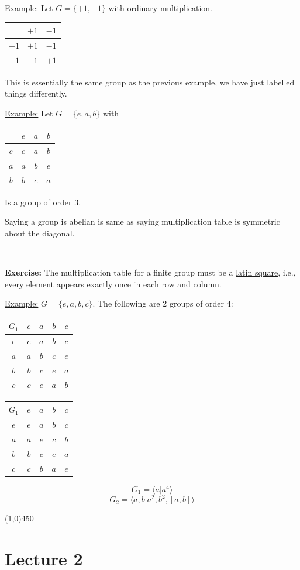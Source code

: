 \documentclass{article}
\theoremstyle{definition}
\begin{document}
\noindent\underline{Example:} Let $G=\{+1,-1\}$ with ordinary multiplication.
\begin{table}[H]
    \centering
    \begin{tabular}{c|cc}
        & $+1$ & $-1$\\
        \hline
        $+1$ & $+1$ & $-1$\\
        $-1$ & $-1$ & $+1$
    \end{tabular}
\end{table}
This is essentially the same group as the previous example, we have just labelled things differently.

\noindent\underline{Example:} Let $G=\{e,a,b\}$ with
\begin{table}[H]
    \centering
    \begin{tabular}{c|ccc}
        & $e$ & $a$ & $b$\\
        \hline
        $e$ & $e$ & $a$ & $b$\\
        $a$ & $a$ & $b$ & $e$\\
        $b$ & $b$ & $e$ & $a$
    \end{tabular}
\end{table}
Is a group of order $3$.

Saying a group is abelian is same as saying multiplication table is symmetric about the diagonal.

\ 

\noindent\textbf{Exercise:} The multiplication table for a finite group must be a \underline{latin square}, i.e., every element appears exactly once in each row and column.

\noindent\underline{Example:} $G=\{e,a,b,c\}$. The following are 2 groups of order 4:
\begin{table}[H]
    \centering
    \begin{tabular}{c|cccc}
        $G_1$ & $e$ & $a$ & $b$ & $c$\\
        \hline
        $e$ & $e$ & $a$ & $b$ & $c$\\
        $a$ & $a$ & $b$ & $c$ & $e$\\
        $b$ & $b$ & $c$ & $e$ & $a$\\
        $c$ & $c$ & $e$ & $a$ & $b$
    \end{tabular}
\end{table}

\begin{table}[H]
    \centering
    \begin{tabular}{c|cccc}
        $G_1$ & $e$ & $a$ & $b$ & $c$\\
        \hline
        $e$ & $e$ & $a$ & $b$ & $c$\\
        $a$ & $a$ & $e$ & $c$ & $b$\\
        $b$ & $b$ & $c$ & $e$ & $a$\\
        $c$ & $c$ & $b$ & $a$ & $e$
    \end{tabular}
\end{table}

$$G_1=\langle a|a^4\rangle$$
$$G_2=\langle a,b|a^2,b^2,[a,b]\rangle$$

\begin{center}
	\line(1,0){450}
\end{center}

\section*{Lecture 2}
\end{document}
